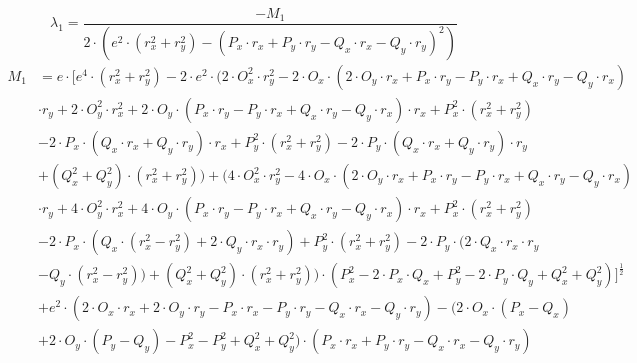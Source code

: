 \documentclass[reducespace,stylepage,semiarbeit]{spezidoc}
\begin{document}
\begin{equation*}
\lambda_1 = \dfrac{- M_1}{2 \cdot (e^{2} \cdot (r_x^{2} + r_y^{2}) - (P_x \cdot r_x + P_y \cdot r_y - Q_x \cdot r_x - Q_y \cdot r_y)^{2})}
\end{equation*}
\begin{equation*}
\begin{aligned}
M_1 &= e \cdot [e^{4} \cdot (r_x^{2} + r_y^{2}) - 2 \cdot e^{2} \cdot (2 \cdot O_x^{2} \cdot r_y^{2} - 2 \cdot O_x \cdot (2 \cdot O_y \cdot r_x + P_x \cdot r_y - P_y \cdot r_x + Q_x \cdot r_y - Q_y \cdot r_x) \\
& \cdot r_y + 2 \cdot O_y^{2} \cdot r_x^{2} + 2 \cdot O_y \cdot (P_x \cdot r_y - P_y \cdot r_x + Q_x \cdot r_y - Q_y \cdot r_x) \cdot r_x + P_x^{2} \cdot (r_x^{2} + r_y^{2}) \\
&- 2 \cdot P_x \cdot (Q_x \cdot r_x + Q_y \cdot r_y) \cdot r_x + P_y^{2} \cdot (r_x^{2} + r_y^{2}) - 2 \cdot P_y \cdot (Q_x \cdot r_x + Q_y \cdot r_y) \cdot r_y \\
&+ (Q_x^{2} + Q_y^{2}) \cdot (r_x^{2} + r_y^{2})) + (4 \cdot O_x^{2} \cdot r_y^{2} - 4 \cdot O_x \cdot (2 \cdot O_y \cdot r_x + P_x \cdot r_y - P_y \cdot r_x + Q_x \cdot r_y - Q_y \cdot r_x) \\
&\cdot r_y + 4 \cdot O_y^{2} \cdot r_x^{2} + 4 \cdot O_y \cdot (P_x \cdot r_y - P_y \cdot r_x + Q_x \cdot r_y - Q_y \cdot r_x) \cdot r_x + P_x^{2} \cdot (r_x^{2} + r_y^{2}) \\
&- 2 \cdot P_x \cdot (Q_x \cdot (r_x^{2} - r_y^{2}) + 2 \cdot Q_y \cdot r_x \cdot r_y) + P_y^{2} \cdot (r_x^{2} + r_y^{2}) - 2 \cdot P_y \cdot (2 \cdot Q_x \cdot r_x \cdot r_y \\
&- Q_y \cdot (r_x^{2} - r_y^{2})) + (Q_x^{2} + Q_y^{2}) \cdot (r_x^{2} + r_y^{2})) \cdot (P_x^{2} - 2 \cdot P_x \cdot Q_x + P_y^{2} - 2 \cdot P_y \cdot Q_y + Q_x^{2} + Q_y^{2})]^{\frac{1}{2}} \\
&+ e^{2} \cdot (2 \cdot O_x \cdot r_x + 2 \cdot O_y \cdot r_y - P_x \cdot r_x - P_y \cdot r_y - Q_x \cdot r_x - Q_y \cdot r_y) - (2 \cdot O_x \cdot (P_x - Q_x) \\
&+ 2 \cdot O_y \cdot (P_y - Q_y) - P_x^{2} - P_y^{2} + Q_x^{2} + Q_y^{2}) \cdot (P_x \cdot r_x + P_y \cdot r_y - Q_x \cdot r_x - Q_y \cdot r_y)
\end{aligned}
\end{equation*}
\end{document}
